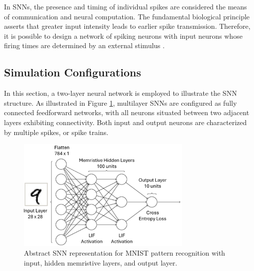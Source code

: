 \noindent In SNNs, the presence and timing of individual spikes are considered the means of communication and neural computation. The fundamental biological principle asserts that greater input intensity leads to earlier spike transmission. Therefore, it is possible to design a network of spiking neurons with input neurons whose firing times are determined by an external stimulus \cite{serrano2013stdp}.

\subsection[Simulation Configurations]{Simulation Configurations}


In this section, a two-layer neural network is employed to illustrate the SNN structure. As illustrated in Figure \ref{fig:6i}, multilayer SNNs are configured as fully connected feedforward networks, with all neurons situated between two adjacent layers exhibiting connectivity. Both input and output neurons are characterized by multiple spikes, or spike trains.\\
\begin{figure}[htbp!] 
    \centering    
    \includegraphics[width=0.75\textwidth]{Chapter6/Figs/i.png}
    \caption[Abstract SNN representation for MNIST pattern recognition with input, hidden memristive layers, and output layer.]{Abstract SNN representation for MNIST pattern recognition with input, hidden memristive
    layers, and output layer.}
    \label{fig:6i}
\end{figure}

